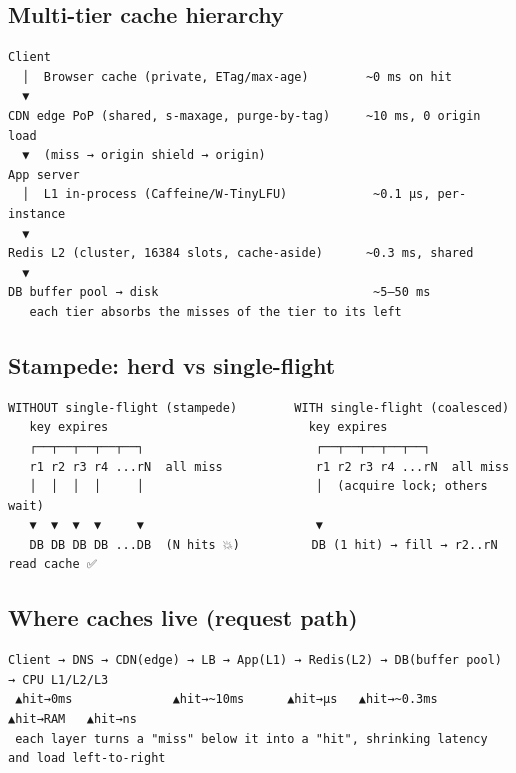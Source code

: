 \documentclass[11pt]{article}
\begin{document}
\subsection{Multi-tier cache hierarchy}\label{multi-tier-cache-hierarchy}

\setcodelang{}

\begin{verbatim}
Client
  │  Browser cache (private, ETag/max-age)        ~0 ms on hit
  ▼
CDN edge PoP (shared, s-maxage, purge-by-tag)     ~10 ms, 0 origin load
  ▼  (miss → origin shield → origin)
App server
  │  L1 in-process (Caffeine/W-TinyLFU)            ~0.1 µs, per-instance
  ▼
Redis L2 (cluster, 16384 slots, cache-aside)      ~0.3 ms, shared
  ▼
DB buffer pool → disk                              ~5–50 ms
   each tier absorbs the misses of the tier to its left
\end{verbatim}

\subsection{Stampede: herd vs single-flight}\label{stampede-herd-vs-single-flight}

\setcodelang{}

\begin{verbatim}
WITHOUT single-flight (stampede)        WITH single-flight (coalesced)
   key expires                            key expires
   ┌──┬──┬──┬──┬──┐                        ┌──┬──┬──┬──┬──┐
   r1 r2 r3 r4 ...rN  all miss             r1 r2 r3 r4 ...rN  all miss
   │  │  │  │     │                        │  (acquire lock; others wait)
   ▼  ▼  ▼  ▼     ▼                        ▼
   DB DB DB DB ...DB  (N hits 💥)          DB (1 hit) → fill → r2..rN read cache ✅
\end{verbatim}

\subsection{Where caches live (request path)}\label{where-caches-live-request-path}

\setcodelang{}

\begin{verbatim}
Client → DNS → CDN(edge) → LB → App(L1) → Redis(L2) → DB(buffer pool) → CPU L1/L2/L3
 ▲hit→0ms              ▲hit→~10ms      ▲hit→µs   ▲hit→~0.3ms   ▲hit→RAM   ▲hit→ns
 each layer turns a "miss" below it into a "hit", shrinking latency and load left-to-right
\end{verbatim}
\end{document}
